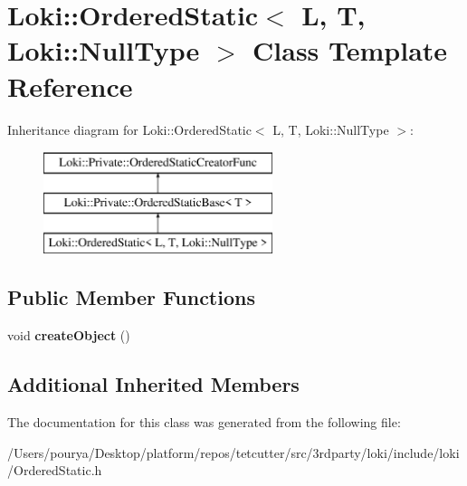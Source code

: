 \hypertarget{classLoki_1_1OrderedStatic_3_01L_00_01T_00_01Loki_1_1NullType_01_4}{}\section{Loki\+:\+:Ordered\+Static$<$ L, T, Loki\+:\+:Null\+Type $>$ Class Template Reference}
\label{classLoki_1_1OrderedStatic_3_01L_00_01T_00_01Loki_1_1NullType_01_4}
Inheritance diagram for Loki\+:\+:Ordered\+Static$<$ L, T, Loki\+:\+:Null\+Type $>$\+:\begin{figure}[H]
\begin{center}
\leavevmode
\includegraphics[height=3.000000cm]{classLoki_1_1OrderedStatic_3_01L_00_01T_00_01Loki_1_1NullType_01_4}
\end{center}
\end{figure}
\subsection*{Public Member Functions}
\begin{DoxyCompactItemize}
\item 
\hypertarget{classLoki_1_1OrderedStatic_3_01L_00_01T_00_01Loki_1_1NullType_01_4_acaeecc9b59dd2d8da84a4d5946f1a46e}{}void {\bfseries create\+Object} ()\label{classLoki_1_1OrderedStatic_3_01L_00_01T_00_01Loki_1_1NullType_01_4_acaeecc9b59dd2d8da84a4d5946f1a46e}

\end{DoxyCompactItemize}
\subsection*{Additional Inherited Members}


The documentation for this class was generated from the following file\+:\begin{DoxyCompactItemize}
\item 
/\+Users/pourya/\+Desktop/platform/repos/tetcutter/src/3rdparty/loki/include/loki/Ordered\+Static.\+h\end{DoxyCompactItemize}
